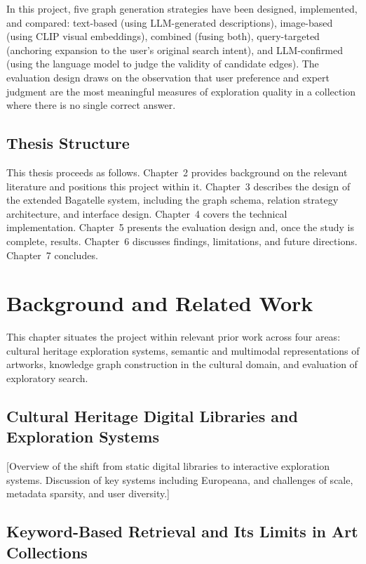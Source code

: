 \documentclass[12pt, a4paper]{article}
\begin{document}
In this project, five graph generation strategies have been designed, implemented, and compared:
text-based (using LLM-generated descriptions), image-based (using CLIP visual embeddings),
combined (fusing both), query-targeted (anchoring expansion to the user's original search intent),
and LLM-confirmed (using the language model to judge the validity of candidate edges). The
evaluation design draws on the observation that user preference and expert judgment are the most
meaningful measures of exploration quality in a collection where there is no single correct answer.

\subsection{Thesis Structure}

This thesis proceeds as follows. Chapter~2 provides background on the relevant literature and
positions this project within it. Chapter~3 describes the design of the extended Bagatelle system,
including the graph schema, relation strategy architecture, and interface design. Chapter~4 covers
the technical implementation. Chapter~5 presents the evaluation design and, once the study is
complete, results. Chapter~6 discusses findings, limitations, and future directions. Chapter~7
concludes.

\section{Background and Related Work}

This chapter situates the project within relevant prior work across four areas: cultural heritage
exploration systems, semantic and multimodal representations of artworks, knowledge graph
construction in the cultural domain, and evaluation of exploratory search.

\subsection{Cultural Heritage Digital Libraries and Exploration Systems}

[Overview of the shift from static digital libraries to interactive exploration systems. Discussion
of key systems including Europeana, and challenges of scale, metadata sparsity, and user
diversity.]

\subsection{Keyword-Based Retrieval and Its Limits in Art Collections}
\end{document}
